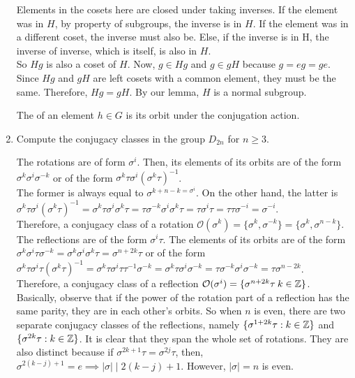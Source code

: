 \documentclass{amsart}
\begin{document}
\begin{enumerate}[itemsep=0.2in]
Elements in the cosets here are closed under taking inverses. If the element was in $H$, by property of subgroups, the inverse is in $H$. If the element was in a different coset, the inverse must also be. Else, if the inverse is in H, the  inverse of inverse, which is itself, is also in $H$.\\

So $Hg$ is also a coset of $H$. Now, $g\in Hg$ and $g\in gH$ because $g=eg=ge$. Since $Hg$ and $gH$ are left cosets with a common element, they must be the same. Therefore, $Hg=gH$. By our lemma, $H$ is a normal subgroup.

\vspace{0.2in}

The  of an element $h\in G$ is its orbit under the conjugation action.

\item Compute the conjugacy classes in the group $D_{2n}$ for $n\ge 3$.

The rotations are of form $\sigma^i$. Then, its elements of its orbits are of the form $\sigma^k\sigma^i\sigma^{-k}$ or of the form $\sigma^k\tau\sigma^i(\sigma^k\tau)^{-1}$.\\

The former is always equal to $\sigma^{k+n-k=\sigma^i}$. On the other hand, the latter is $\sigma^k\tau\sigma^i(\sigma^k\tau)^{-1}=\sigma^k\tau\sigma^i\sigma^k\tau=\tau\sigma^{-k}\sigma^i\sigma^k\tau=\tau\sigma^i\tau=\tau\tau\sigma^{-i}=\sigma^{-i}$.\\

Therefore, a conjugacy class of a rotation $\mathcal{O}(\sigma^k)=\{\sigma^k,\sigma^{-k}\}=\{\sigma^k,\sigma^{n-k}\}$.\\

The reflections are of the form $\sigma^i\tau$. The elements of its orbits are of the form $\sigma^k\sigma^i\tau\sigma^{-k}=\sigma^k\sigma^i\sigma^k\tau=\sigma^{n+2k}\tau$ or of the form $\sigma^k\tau\sigma^i\tau(\sigma^k\tau)^{-1}=\sigma^k\tau\sigma^i\tau\tau^{-1}\sigma^{-k}=\sigma^k\tau\sigma^i\sigma^{-k}=\tau\sigma^{-k}\sigma^i\sigma^{-k}=\tau\sigma^{n-2k}$.\\

Therefore, a conjugacy class of a reflection $\mathcal{O}(\sigma^i)=\{\sigma^{n+2k}\tau\:k\in\mathbb{Z}\}$. Basically, observe that if the power of the rotation part of a reflection has the same parity, they are in each other's orbits. So when $n$ is even, there are two separate conjugacy classes of the reflections, namely $\{\sigma^{1+2k}\tau:k\in\mathbb{Z}\}$ and $\{\sigma^{2k}\tau:k\in\mathbb{Z}\}$. It is clear that they span the whole set of rotations. They are also distinct because if $\sigma^{2k+1}\tau=\sigma^{2j}\tau$, then, $\sigma^{2(k-j)+1}=e\implies|\sigma|\mid 2(k-j)+1$. However, $|\sigma|=n$ is even.\\


\end{enumerate}
\end{document}
